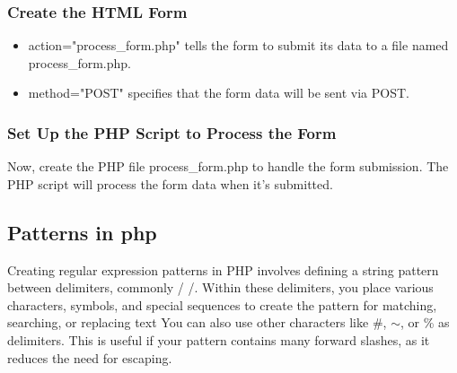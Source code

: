\documentclass{report}
\begin{document}
\bigbreak \noindent 
\subsubsection{Create the HTML Form}
\bigbreak \noindent 
\begin{itemize}
    \item action="process\_form.php" tells the form to submit its data to a file named process\_form.php.
    \item method="POST" specifies that the form data will be sent via POST.
\end{itemize}

\bigbreak \noindent 
\subsubsection{ Set Up the PHP Script to Process the Form}
\bigbreak \noindent 
Now, create the PHP file process\_form.php to handle the form submission. The PHP script will process the form data when it’s submitted.
\bigbreak \noindent 
{}

\pagebreak 
{}
\bigbreak \noindent 
\subsection{Patterns in php}
\bigbreak \noindent 
Creating regular expression patterns in PHP involves defining a string pattern between delimiters, commonly / /. Within these delimiters, you place various characters, symbols, and special sequences to create the pattern for matching, searching, or replacing text
\bigbreak \noindent 
You can also use other characters like \#, $\sim$, or \% as delimiters. This is useful if your pattern contains many forward slashes, as it reduces the need for escaping.
\end{document}
